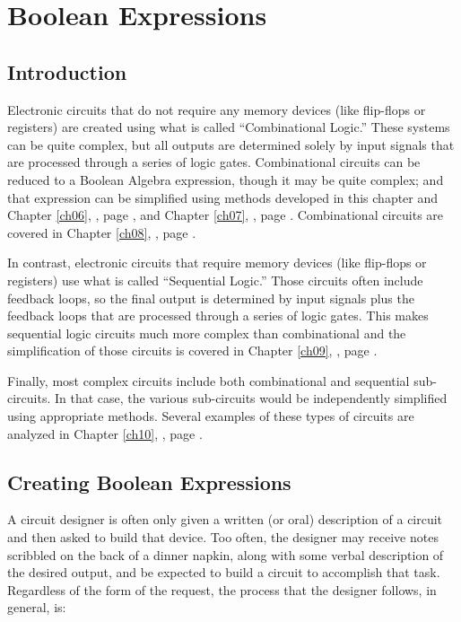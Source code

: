 \chapter{Boolean Expressions}\label{ch05}
\section{Introduction}

Electronic circuits that do not require any memory devices (like flip-flops or registers) are created using what is called ``Combinational Logic.'' These systems can be quite complex, but all outputs are determined solely by input signals that are processed through a series of logic gates. Combinational circuits can be reduced to a Boolean Algebra expression, though it may be quite complex; and that expression can be simplified using methods developed in this chapter and Chapter \ref{ch06}, , page \pageref{ch06}, and Chapter \ref{ch07}, , page \pageref{ch07}. Combinational circuits are covered in Chapter \ref{ch08}, , page \pageref{ch08}.

In contrast, electronic circuits that require memory devices (like flip-flops or registers) use what is called ``Sequential Logic.'' Those circuits often include feedback loops, so the final output is determined by input signals plus the feedback loops that are processed through a series of logic gates. This makes sequential logic circuits much more complex than combinational and the simplification of those circuits is covered in Chapter \ref{ch09}, , page \pageref{ch09}. 

Finally, most complex circuits include both combinational and sequential sub-circuits. In that case, the various sub-circuits would be independently simplified using appropriate methods. Several examples of these types of circuits are analyzed in Chapter \ref{ch10}, , page \pageref{ch10}.

\section{Creating Boolean Expressions}

A circuit designer is often only given a written (or oral) description of a circuit and then asked to build that device. Too often, the designer may receive notes scribbled on the back of a dinner napkin, along with some verbal description of the desired output, and be expected to build a circuit to accomplish that task. Regardless of the form of the request, the process that the designer follows, in general, is: 

